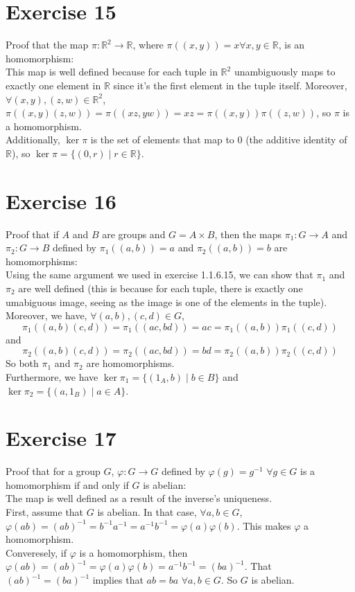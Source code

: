 \documentclass[12pt]{article}
\newcommand{\R}{\mathbb{R}}
\begin{document}
    \section*{Exercise 15}
    Proof that the map $\pi: \R^2 \to \R$,
    where $\pi((x, y)) = x \forall x, y \in \R$, is an homomorphism: \\
    This map is well defined because for each tuple in $\R^2$
    unambiguously maps to exactly one element in $\R$
    since it's the first element in the tuple itself.
    Moreover, $\forall (x, y), (z, w) \in \R^2$,
    $\pi((x, y)(z, w)) = \pi((xz, yw)) = xz = \pi((x, y))\pi((z, w))$,
    so $\pi$ is a homomorphism. \\
    Additionally, $\ker \pi$ is the set of elements that map to $0$
    (the additive identity of $\R$),
    so $\ker \pi = \{(0, r) \mid r \in \R\}$.                                                       


    \section*{Exercise 16}
    Proof that if $A$ and $B$ are groups and $G = A \times B$,
    then the maps $\pi_1: G \to A$ and $\pi_2: G \to B$ defined by
    $\pi_1((a, b)) = a$ and $\pi_2((a, b)) = b$ are homomorphisms: \\
    Using the same argument we used in exercise 1.1.6.15,
    we can show that $\pi_1$ and $\pi_2$ are well defined
    (this is because for each tuple, there is exactly one umabiguous image,
    seeing as the image is one of the elements in the tuple).\\
    Moreover, we have, $\forall (a, b), (c, d) \in G$,
    \[ \pi_1((a, b)(c, d)) = \pi_1((ac, bd))
    = ac
    = \pi_1((a, b))\pi_1((c, d)) \]
    and
    \[ \pi_2((a, b)(c, d)) = \pi_2((ac, bd))
    = bd
    = \pi_2((a, b))\pi_2((c, d)) \]
    So both $\pi_1$ and $\pi_2$ are homomorphisms. \\
    Furthermore, we have $\ker \pi_1 = \{(1_A, b) \mid b \in B\}$
    and $\ker \pi_2 = \{(a, 1_B) \mid a \in A\}$.


    \section*{Exercise 17}
    Proof that for a group $G$, $\varphi: G \to G$
    defined by $\varphi(g) = g^{-1}$ $\forall g \in G$
    is a homomorphism if and only if $G$ is abelian: \\
    The map is well defined as a result of the inverse's uniqueness. \\
    First, assume that $G$ is abelian.
    In that case, $\forall a, b \in G$,
    $\varphi(ab) = (ab)^{-1} = b^{-1}a^{-1} 
    = a^{-1}b^{-1}
    = \varphi(a)\varphi(b)$.
    This makes $\varphi$ a homomorphism. \\
    Converesely, if $\varphi$ is a homomorphism,
    then $\varphi(ab) = (ab)^{-1}
    = \varphi(a)\varphi(b)
    = a^{-1}b^{-1} 
    = (ba)^{-1}$.
    That $(ab)^{-1} = (ba)^{-1}$ implies that $ab = ba$ $\forall a, b \in G$.
    So $G$ is abelian.
\end{document}
